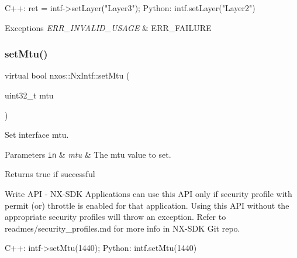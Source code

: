 \begin{DoxyCode}
C++:
   ret = intf->setLayer(\textcolor{stringliteral}{"Layer3"});
Python:
   intf.setLayer(\textcolor{stringliteral}{"Layer2"})
\end{DoxyCode}



\begin{DoxyExceptions}{Exceptions}
{\em E\+R\+R\+\_\+\+I\+N\+V\+A\+L\+I\+D\+\_\+\+U\+S\+A\+GE} & E\+R\+R\+\_\+\+F\+A\+I\+L\+U\+RE \\
\hline
\end{DoxyExceptions}
\mbox{\label{classnxos_1_1_nx_intf_ae2790907b869c62c01567452d66d03f9}} 
\subsubsection{\texorpdfstring{set\+Mtu()}{setMtu()}}
{\footnotesize\ttfamily virtual bool nxos\+::\+Nx\+Intf\+::set\+Mtu (\begin{DoxyParamCaption}\item[{uint32\+\_\+t}]{mtu }\end{DoxyParamCaption})\hspace{0.3cm}{\ttfamily [pure virtual]}}

Set interface mtu. 
\begin{DoxyParams}[1]{Parameters}
\mbox{\tt in}  & {\em mtu} & The mtu value to set. \\
\hline
\end{DoxyParams}
\begin{DoxyReturn}{Returns}
true if successful
\end{DoxyReturn}
\begin{DoxyVerb}Write API - NX-SDK Applications can use this API only if security profile with permit (or) throttle is 
            enabled for that application. Using this API without the appropriate security profiles will
            throw an exception. Refer to readmes/security_profiles.md for more info in NX-SDK Git repo.
\end{DoxyVerb}



\begin{DoxyCode}
C++:
     intf->setMtu(1440);
Python:
     intf.setMtu(1440)
\end{DoxyCode}




